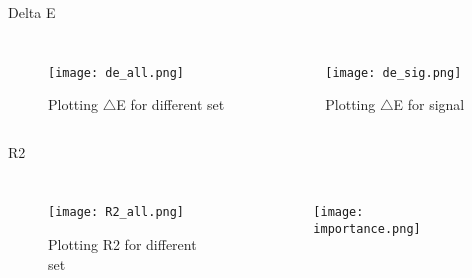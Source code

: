 \documentclass[12pt]{beamer}
\begin{document}
\begin{frame}[t]{Delta E}
	\begin{scriptsize}
		\begin{columns}
			\begin{figure}
				\texttt{[image: de\_all.png]}
				\caption{Plotting $\bigtriangleup$E for different set}
			\end{figure}
			
			\begin{figure}
				\texttt{[image: de\_sig.png]}
				\caption{Plotting $\bigtriangleup$E for signal}
			\end{figure}
			
		\end{columns}
	\end{scriptsize}
\end{frame}

\begin{frame}[t]{R2}

			\begin{columns}
			\column{0.7\textwidth}
				\begin{figure}
				\vspace{-1cm}
				\texttt{[image: R2\_all.png]}
				\caption{Plotting R2 for different set}
				\end{figure}			
			\column{0.3\textwidth}
			\begin{figure}
				\vspace{-0.8cm}
				\texttt{[image: importance.png]}
			\end{figure}
		\end{columns}

\end{frame}
\end{document}
